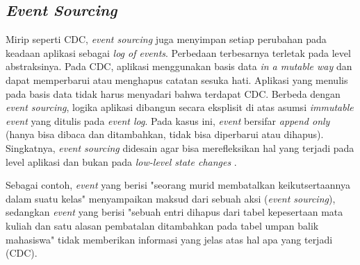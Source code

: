 \subsection{\textit{Event Sourcing}}

Mirip seperti CDC, \textit{event sourcing} juga menyimpan setiap perubahan pada keadaan aplikasi sebagai \textit{log of events}. Perbedaan terbesarnya terletak pada level abstraksinya. Pada CDC, aplikasi menggunakan basis data \textit{in a mutable way} dan dapat memperbarui atau menghapus catatan sesuka hati. Aplikasi yang menulis pada basis data tidak harus menyadari bahwa terdapat CDC. Berbeda dengan \textit{event sourcing}, logika aplikasi dibangun secara eksplisit di atas asumsi \textit{immutable event} yang ditulis pada \textit{event log}. Pada kasus ini, \textit{event} bersifar \textit{append only} (hanya bisa dibaca dan ditambahkan, tidak bisa diperbarui atau dihapus). Singkatnya, \textit{event sourcing} didesain agar bisa merefleksikan hal yang terjadi pada level aplikasi dan bukan pada \textit{low-level state changes} \parencite{dataIntensiveApplications}.

Sebagai contoh, \textit{event} yang berisi "seorang murid membatalkan keikutsertaannya dalam suatu kelas" menyampaikan maksud dari sebuah aksi (\textit{event sourcing}), sedangkan \textit{event} yang berisi "sebuah entri dihapus dari tabel kepesertaan mata kuliah dan satu alasan pembatalan ditambahkan pada tabel umpan balik mahasiswa" tidak memberikan informasi yang jelas atas hal apa yang terjadi (CDC).